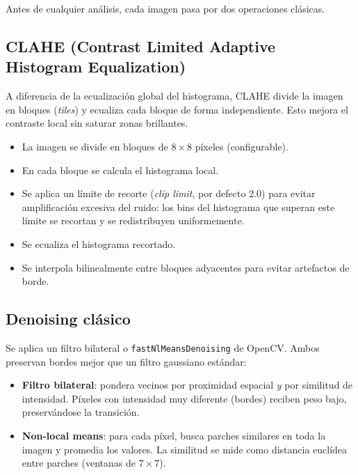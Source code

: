\documentclass[11pt,a4paper]{article}
\begin{document}
Antes de cualquier an\'{a}lisis, cada imagen pasa por dos operaciones cl\'{a}sicas.

\subsection{CLAHE (Contrast Limited Adaptive Histogram Equalization)}

A diferencia de la ecualizaci\'{o}n global del histograma, CLAHE divide la imagen en bloques (\textit{tiles}) y ecualiza cada bloque de forma independiente. Esto mejora el contraste local sin saturar zonas brillantes.

\begin{itemize}
  \item La imagen se divide en bloques de $8 \times 8$ p\'{i}xeles (configurable).
  \item En cada bloque se calcula el histograma local.
  \item Se aplica un l\'{i}mite de recorte (\textit{clip limit}, por defecto 2.0) para evitar amplificaci\'{o}n excesiva del ruido: los bins del histograma que superan este l\'{i}mite se recortan y se redistribuyen uniformemente.
  \item Se ecualiza el histograma recortado.
  \item Se interpola bilinealmente entre bloques adyacentes para evitar artefactos de borde.
\end{itemize}

\subsection{Denoising cl\'{a}sico}

Se aplica un filtro bilateral o \texttt{fastNlMeansDenoising} de OpenCV. Ambos preservan bordes mejor que un filtro gaussiano est\'{a}ndar:

\begin{itemize}
  \item \textbf{Filtro bilateral}: pondera vecinos por proximidad espacial \textit{y} por similitud de intensidad. P\'{i}xeles con intensidad muy diferente (bordes) reciben peso bajo, preserv\'{a}ndose la transici\'{o}n.
  \item \textbf{Non-local means}: para cada p\'{i}xel, busca parches similares en toda la imagen y promedia los valores. La similitud se mide como distancia eucl\'{i}dea entre parches (ventanas de $7 \times 7$).
\end{itemize}

\end{document}
